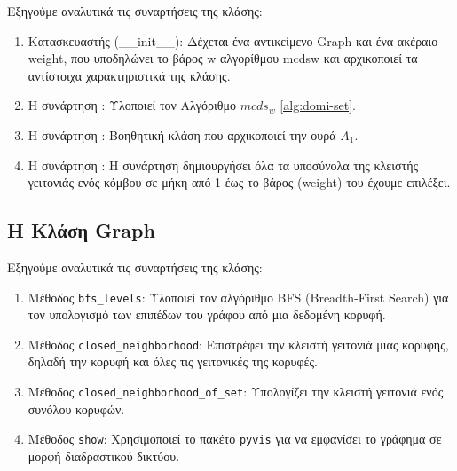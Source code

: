 Εξηγούμε αναλυτικά τις συναρτήσεις της κλάσης:

\begin{enumerate}
	\item Κατασκευαστής (\_\_init\_\_): Δέχεται ένα αντικείμενο Graph και ένα ακέραιο weight, που υποδηλώνει το βάρος w αλγορίθμου mcdsw και αρχικοποιεί τα αντίστοιχα χαρακτηριστικά της κλάσης.
	\item Η συνάρτηση : Υλοποιεί τον Αλγόριθμο $mcds_{w}$ \ref{alg:domi-set}.
	\item H συνάρτηση : Βοηθητική κλάση που αρχικοποιεί την ουρά $A_1$.
	\item H συνάρτηση :  H συνάρτηση δημιουργήσει όλα τα υποσύνολα της κλειστής γειτονιάς ενός κόμβου σε μήκη από 1 έως το βάρος (weight) του έχουμε επιλέξει.
\end{enumerate}

\subsection{H Kλάση Graph}



Εξηγούμε αναλυτικά τις συναρτήσεις της κλάσης:

\begin{enumerate}
	
	\item Μέθοδος \texttt{bfs\_levels}: Υλοποιεί τον αλγόριθμο BFS (Breadth-First Search) για τον υπολογισμό των επιπέδων του γράφου από μια δεδομένη κορυφή.
	
	\item Μέθοδος \texttt{closed\_neighborhood}: Επιστρέφει την κλειστή γειτονιά μιας κορυφής, δηλαδή την κορυφή και όλες τις γειτονικές της κορυφές.
	
	\item Μέθοδος \texttt{closed\_neighborhood\_of\_set}: Υπολογίζει την κλειστή γειτονιά ενός συνόλου κορυφών.
	
	\item Μέθοδος \texttt{show}: Χρησιμοποιεί το πακέτο \texttt{pyvis} για να εμφανίσει το γράφημα σε μορφή διαδραστικού δικτύου.
	
\end{enumerate}

